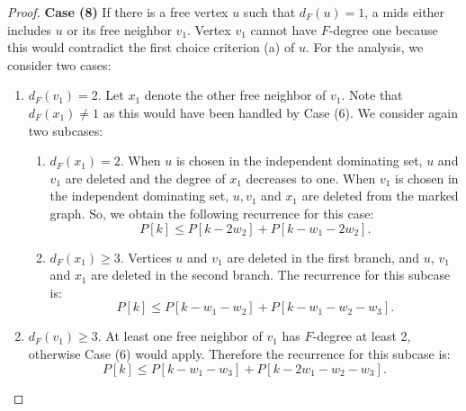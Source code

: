 \documentclass[a4paper,10pt]{article}
\theoremstyle{plain}
\theoremstyle{definition}
\theoremstyle{remark}
\newcommand{\ids}{independent dominating set\xspace}
\newcommand{\mids}{mids\xspace}
\begin{document}
\begin{proof}
{\bf Case (8)}
If there is a free vertex $u$ such that $d_F(u)=1$, a \mids either includes $u$
or its free neighbor $v_1$. Vertex $v_1$ cannot have $F$-degree one
because this would contradict the first choice criterion (a) of $u$. For the analysis, we
consider two cases:
\begin{enumerate}
\item $d_F(v_1)=2$. Let $x_1$ denote the other free neighbor of $v_1$. Note that 
$d_F(x_1) \not = 1$ as this would have been handled by Case (6).
We consider again two subcases:
\begin{enumerate}
\item $d_F(x_1)=2$. When $u$ is chosen in the \ids, $u$ and $v_1$ are deleted and the
degree of $x_1$ decreases to one. When $v_1$ is chosen in the \ids, $u,v_1$ and $x_1$
are deleted from the marked graph. So, we obtain the following recurrence for
this case:
\begin{equation}
P[k] \leq P[k-2w_2] + P[k-w_1-2w_2].
\end{equation}

\item $d_F(x_1) \geq 3$. Vertices $u$ and $v_1$ are deleted in the first branch,
and $u$, $v_1$ and $x_1$ are deleted in the
second branch. The recurrence for this subcase is:
\begin{equation}
P[k] \leq P[k-w_1-w_2] + P[k-w_1-w_2-w_3].\label{rec:tight1}
\end{equation}
\end{enumerate}

\item $d_F(v_1) \geq 3$. At least one free neighbor of $v_1$ has $F$-degree at
least 2, otherwise Case (6) would apply. Therefore the recurrence
for this subcase is:
\begin{equation}
P[k] \leq P[k-w_1-w_3] + P[k-2w_1-w_2-w_3].
\end{equation}
\end{enumerate}


\end{proof}
\end{document}
